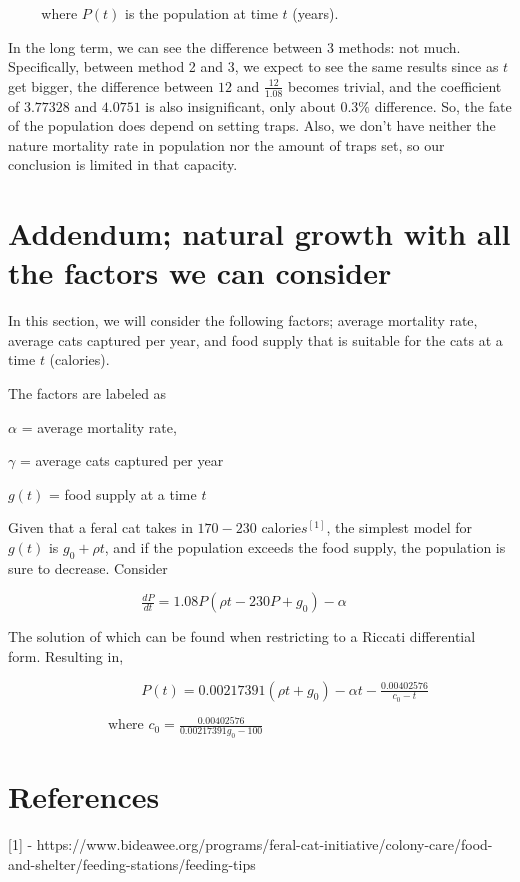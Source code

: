 \documentclass{article}
\begin{document}
$\hspace{1cm}$where $P(t)$ is the population at time $t$ (years).

In the long term, we can see the difference between 3 methods: not much. Specifically, between method 2 and 3, we expect to see the same results since as $t$ get bigger, the difference between $12$ and $\frac{12}{1.08}$ becomes trivial, and the coefficient of $3.77328$ and $4.0751$ is also insignificant, only about $0.3\%$ difference. So, the fate of the population does depend on setting traps. Also, we don't have neither the nature mortality rate in population nor the amount of traps set, so our conclusion is limited in that capacity.


\section{Addendum; natural growth with all the factors we can consider}

In this section, we will consider the following factors; average mortality rate, average cats captured per year, and food supply that is suitable for the cats at a time $t$ (calories).

The factors are labeled as

$\alpha$ = average mortality rate,

$\gamma$ = average cats captured per year

$g(t)$ = food supply at a time $t$

Given that a feral cat takes in $170-230$ calorie$s^{[1]}$, the simplest model for $g(t)$ is $g_{0} + \rho t$, and if the population exceeds the food supply, the population is sure to decrease. Consider

\begin{math}
\hspace{4cm}
    \frac{dP}{dt} = 1.08P(\rho t - 230P + g_{0}) - \alpha
\end{math}

The solution of which can be found when restricting to a Riccati differential form. Resulting in,

    $\hspace{4cm} P(t) = 0.00217391(\rho t + g_{0}) - \alpha t - \frac{0.00402576}{c_0 - t}$

$\hspace{3cm} \text{where }c_{0} = \frac{0.00402576}{0.00217391g_{0} - 100}$


\section{References}

[1] - https://www.bideawee.org/programs/feral-cat-initiative/colony-care/food-and-shelter/feeding-stations/feeding-tips
\end{document}
